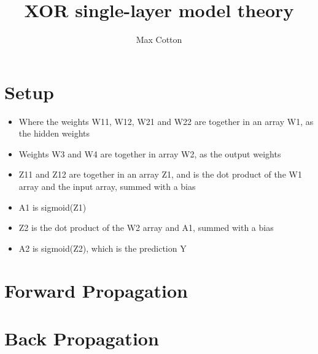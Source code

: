 \documentclass[10pt,a4paper]{article}
\title{XOR single-layer model theory}
\author{Max Cotton}
\date{}
\begin{document}
\maketitle

\section{Setup}
\begin{itemize}
    \item Where the weights W11, W12, W21 and W22 are together in an array W1, as the hidden weights
    \item Weights W3 and W4 are together in array W2, as the output weights
    \item Z11 and Z12 are together in an array Z1, and is the dot product of the W1 array and the input array, summed with a bias 
    \item A1 is sigmoid(Z1)
    \item Z2 is the dot product of the W2 array and A1, summed with a bias
    \item A2 is sigmoid(Z2), which is the prediction Y
\end{itemize}

\section{Forward Propagation}

\section{Back Propagation}

\end{document}
